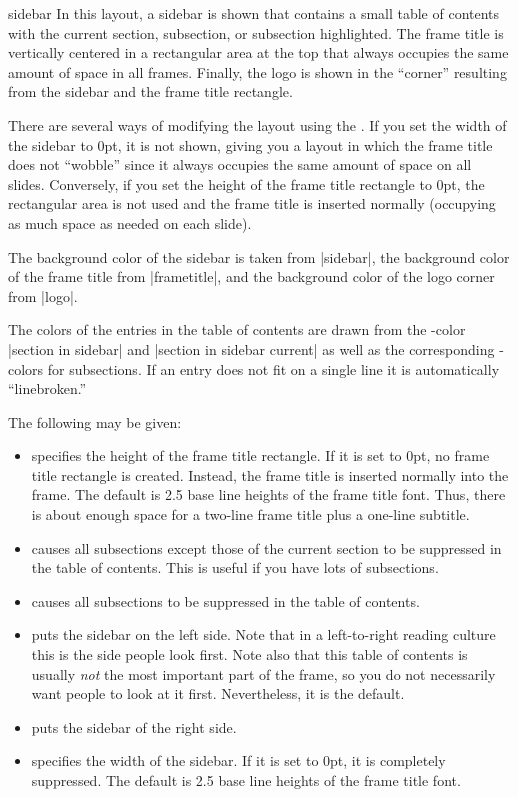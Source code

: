 \begin{outerthemeexample}{sidebar}
  In this layout, a sidebar is shown that contains a small table of contents with the current section, subsection, or subsection highlighted. The frame title is vertically centered in a rectangular area at the top that always occupies the same amount of space in all frames. Finally, the logo is shown in the ``corner'' resulting from the sidebar and the frame title rectangle.

  There are several ways of modifying the layout using the . If you set the width of the sidebar to 0pt, it is not shown, giving you a layout in which the frame title does not ``wobble'' since it always occupies the same amount of space on all slides. Conversely, if you set the height of the frame title rectangle to 0pt, the rectangular area is not used and the frame title is inserted normally (occupying as much space as needed on each slide).

  The background color of the sidebar is taken from |sidebar|, the background color of the frame title from |frametitle|, and the background color of the logo corner from |logo|.

  The colors of the entries in the table of contents are drawn from the \beamer-color |section in sidebar| and |section in sidebar current| as well as the corresponding \beamer-colors for subsections. If an entry does not fit on a single line it is automatically ``linebroken.''

  The following  may be given:
  \begin{itemize}
    \item
     specifies the height of the frame title rectangle. If it is set to 0pt, no frame title rectangle is created. Instead, the frame title is inserted normally into the frame. The default is 2.5 base line heights of the frame title font. Thus, there is about enough space for a two-line frame title plus a one-line subtitle.
    \item
     causes all subsections except those of the current section to be suppressed in the table of contents. This is useful if you have lots of subsections.
    \item
     causes all subsections to be suppressed in the table of contents.
    \item
     puts the sidebar on the left side. Note that in a left-to-right reading culture this is the side people look first. Note also that this table of contents is usually \emph{not} the most important part of the frame, so you do not necessarily want people to look at it first. Nevertheless, it is the default.
    \item
     puts the sidebar of the right side.
    \item
     specifies the width of the sidebar. If it is set to 0pt, it is completely suppressed. The default is 2.5 base line heights of the frame title font.
  \end{itemize}
\end{outerthemeexample}

